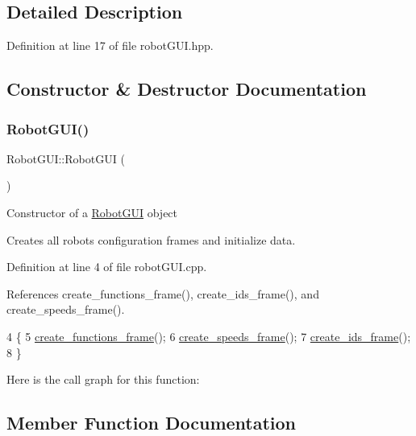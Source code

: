 \subsection{Detailed Description}


Definition at line 17 of file robot\+G\+U\+I.\+hpp.



\subsection{Constructor \& Destructor Documentation}
\mbox{\label{class_robot_g_u_i_a6e5874c7d6304555c48b08bd9c381253}} 
\subsubsection{\texorpdfstring{Robot\+G\+U\+I()}{RobotGUI()}}
{\footnotesize\ttfamily Robot\+G\+U\+I\+::\+Robot\+G\+UI (\begin{DoxyParamCaption}{ }\end{DoxyParamCaption})}

Constructor of a \hyperlink{class_robot_g_u_i}{Robot\+G\+UI} object

Creates all robot\textquotesingle{}s configuration frames and initialize data. 

Definition at line 4 of file robot\+G\+U\+I.\+cpp.



References create\+\_\+functions\+\_\+frame(), create\+\_\+ids\+\_\+frame(), and create\+\_\+speeds\+\_\+frame().


\begin{DoxyCode}
4                    \{
5     \hyperlink{class_robot_g_u_i_ae936fdefc6553a75ec8c1971c50c4add}{create\_functions\_frame}();
6     \hyperlink{class_robot_g_u_i_a05b171a9b805af42e32ed9036478dafe}{create\_speeds\_frame}();
7     \hyperlink{class_robot_g_u_i_a0aa53fbc31e2740779cb078f440a4891}{create\_ids\_frame}();
8 \}
\end{DoxyCode}
Here is the call graph for this function\+:


\subsection{Member Function Documentation}
\mbox{\label{class_robot_g_u_i_ae936fdefc6553a75ec8c1971c50c4add}} 
